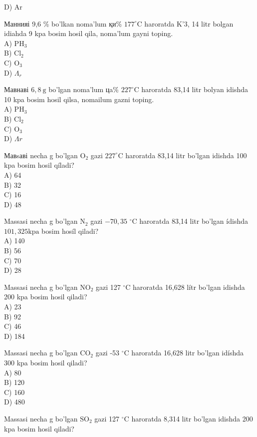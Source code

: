 D) Ar
  \item Маннияі 9,6 \% bo'lkan noma'lum қи\% $177^{\circ} \mathrm{C}$ haroratda K'3, 14 litr bolgan idiahda 9 kpa bosim hosil qila, noma'lum gayni toping.\\
A) $\mathrm{PH}_{3}$\\
B) $\mathrm{Cl}_{2}$\\
C) $\mathrm{O}_{3}$\\
D) $\Lambda_{r}$
  \item Мавнаві $6,8 \mathrm{~g}$ bo'lgan noma'lum цa\% $227^{\circ} \mathrm{C}$ haroratda 83,14 litr bolyan idishda 10 kpa bosim hosil qilsa, nomailum gazni toping.\\
A) $\mathrm{PH}_{3}$\\
B) $\mathrm{Cl}_{2}$\\
C) $\mathrm{O}_{3}$\\
D) $\Lambda r$
  \item Мавsаві necha g bo'lgan $\mathrm{O}_{2}$ gazi $227^{\circ} \mathrm{C}$ haroratda 83,14 litr bo'lgan idishda 100 kpa bosim hosil qíladi?\\
A) 64\\
B) 32\\
C) 16\\
D) 48
  \item Massasi necha g bo'lgan $\mathrm{N}_{2}$ gazi $-70,35$ ${ }^{\circ} \mathrm{C}$ haroratda 83,14 litr bo'lgan ídishda $101,325 \mathrm{kpa}$ bosim hosíl qiladi?\\
A) 140\\
B) 56\\
C) 70\\
D) 28
  \item Massasi necha g bo'lgan $\mathrm{NO}_{2}$ gazi 127 ${ }^{\circ} \mathrm{C}$ haroratda 16,628 lítr bo'lgan idishda 200 kpa bosim hosil qiladi?\\
A) 23\\
B) 92\\
C) 46\\
D) 184
  \item Massasi necha g bo'lgan $\mathrm{CO}_{2}$ gazi -53 ${ }^{\circ} \mathrm{C}$ haroratda 16,628 litr bo'lgan idíshda 300 kpa bosim hosil qiladi?\\
A) 80\\
B) 120\\
C) 160\\
D) 480
  \item Massasi necha g bo'lgan $\mathrm{SO}_{2}$ gazi 127 ${ }^{\circ} \mathrm{C}$ haroratda 8,314 litr bo'lgan idishda 200 kpa bosim hosil qiladi?\\
